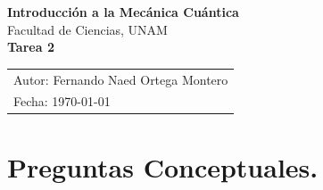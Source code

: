 \documentclass[12pt,a4paper]{article}
\begin{document}
\begin{center}
    {\LARGE \textbf{Introducción a la Mecánica Cuántica}} \\[0.4cm]

    {\large Facultad de Ciencias, UNAM} \\[0.6cm]

    \large \textbf{Tarea 2} \\[0.2cm]

    \begin{tabular}{l}
        \small Autor: Fernando Naed Ortega Montero\\
        \small Fecha: \today
    \end{tabular}
\end{center}



\section*{Preguntas Conceptuales.}
\end{document}
